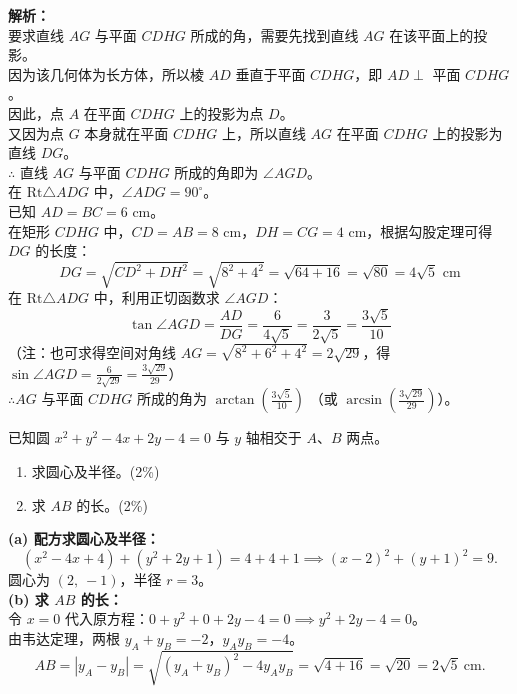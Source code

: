 \documentclass[12pt,a4paper]{exam-zh}
\begin{document}
\begin{solution}
    \textbf{解析：} \\
    要求直线 $AG$ 与平面 $CDHG$ 所成的角，需要先找到直线 $AG$ 在该平面上的投影。 \\
    因为该几何体为长方体，所以棱 $AD$ 垂直于平面 $CDHG$，即 $AD \perp$ 平面 $CDHG$。 \\
    因此，点 $A$ 在平面 $CDHG$ 上的投影为点 $D$。 \\
    又因为点 $G$ 本身就在平面 $CDHG$ 上，所以直线 $AG$ 在平面 $CDHG$ 上的投影为直线 $DG$。 \\
    $\therefore$ 直线 $AG$ 与平面 $CDHG$ 所成的角即为 $\angle AGD$。 \\
    在 $\text{Rt}\triangle ADG$ 中，$\angle ADG = 90^\circ$。 \\
    已知 $AD = BC = 6\text{ cm}$。 \\
    在矩形 $CDHG$ 中，$CD = AB = 8\text{ cm}$，$DH = CG = 4\text{ cm}$，根据勾股定理可得 $DG$ 的长度：
    \[ \displaystyle DG = \sqrt{CD^2 + DH^2} = \sqrt{8^2 + 4^2} = \sqrt{64 + 16} = \sqrt{80} = 4\sqrt{5}\text{ cm} \]
    在 $\text{Rt}\triangle ADG$ 中，利用正切函数求 $\angle AGD$：
    \[ \displaystyle \tan \angle AGD = \frac{AD}{DG} = \frac{6}{4\sqrt{5}} = \frac{3}{2\sqrt{5}} = \frac{3\sqrt{5}}{10} \]
    （注：也可求得空间对角线 $\displaystyle AG = \sqrt{8^2 + 6^2 + 4^2} = 2\sqrt{29}$，得 $\displaystyle \sin \angle AGD = \frac{6}{2\sqrt{29}} = \frac{3\sqrt{29}}{29}$） \\
    $\therefore AG$ 与平面 $CDHG$ 所成的角为 $\displaystyle \arctan\left(\frac{3\sqrt{5}}{10}\right)$ （或 $\displaystyle \arcsin\left(\frac{3\sqrt{29}}{29}\right)$）。
\end{solution}
\begin{question}
    已知圆 $x^2 + y^2 - 4x + 2y - 4 = 0$ 与 $y$ 轴相交于 $A$、$B$ 两点。
    \begin{enumerate}[label=(\alph*)]
        \item 求圆心及半径。\hfill(2\%)
        \item 求 $AB$ 的长。\hfill(2\%)
    \end{enumerate}
\end{question}

\begin{solution}
    \textbf{(a) 配方求圆心及半径：} \\
    \[
        (x^2 - 4x + 4) + (y^2 + 2y + 1) = 4 + 4 + 1
        \implies (x-2)^2 + (y+1)^2 = 9.
    \]
    圆心为 $(2,\ -1)$，半径 $r = 3$。 \\

    \textbf{(b) 求 $AB$ 的长：} \\
    令 $x = 0$ 代入原方程：$0 + y^2 + 0 + 2y - 4 = 0 \implies y^2 + 2y - 4 = 0$。 \\
    由韦达定理，两根 $y_A + y_B = -2$，$y_A y_B = -4$。 \\
    \[
        AB = |y_A - y_B| = \sqrt{(y_A+y_B)^2 - 4y_Ay_B} = \sqrt{4 + 16} = \sqrt{20} = 2\sqrt{5}\ \text{cm}.
    \]
\end{solution}
\end{document}
